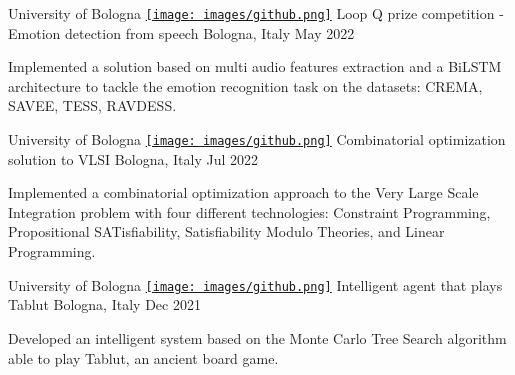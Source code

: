 \begin{cventries}
\cventry
    {University of Bologna} %
    {\href{https://github.com/Dundalia/LoopQPrize_2022}{\texttt{[image: images/github.png]}} Loop Q prize competition - Emotion detection from speech} %
    {Bologna, Italy} %
    {May 2022} %
    {
      \begin{cvitems} %
        \item {Implemented a solution based on multi audio features extraction and a BiLSTM architecture to tackle the emotion recognition task on the datasets: CREMA, SAVEE, TESS, RAVDESS. }
      \end{cvitems}
    }
  
\cventry
    {University of Bologna} %
    {\href{https://github.com/drchapman-17/cdmo2022}{\texttt{[image: images/github.png]}} Combinatorial optimization solution to VLSI} %
    {Bologna, Italy} %
    {Jul 2022} %
    {
      \begin{cvitems} %
        \item {Implemented a combinatorial optimization approach to the Very Large Scale Integration problem with four different technologies: Constraint Programming, Propositional SATisfiability, Satisfiability Modulo Theories, and Linear Programming. }
      \end{cvitems}
    }
  

\cventry
    {University of Bologna} %
    {\href{https://github.com/Simone999/AshtonTablutAgent}{\texttt{[image: images/github.png]}} Intelligent agent that plays Tablut} %
    {Bologna, Italy} %
    {Dec 2021} %
    {
      \begin{cvitems} %
        \item {Developed an intelligent system based on the Monte Carlo Tree Search algorithm able to play Tablut, an ancient board game.}
      \end{cvitems}
    }
  


\end{cventries}
